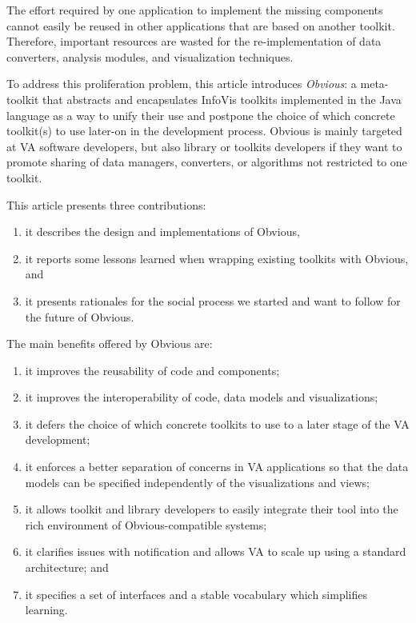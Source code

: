 The effort required by one application to implement the missing
components cannot easily be reused in other applications that are based on another
toolkit.  Therefore, important resources are wasted for the re-implementation of
data converters, analysis modules, and visualization techniques. 

To address this proliferation problem, this article introduces
\emph{Obvious}: a meta-toolkit that abstracts and encapsulates InfoVis
toolkits implemented in the Java language as a way to unify their use
and postpone the choice of which concrete toolkit(s) to use later-on
in the development process.  Obvious is mainly targeted at VA software
developers, but also  library or toolkits developers if they want to
promote sharing of data managers, converters, or algorithms not
restricted to one toolkit.

\noindent This article presents three contributions:
\begin{enumerate}[noitemsep,topsep=0pt]
\item it describes the design and implementations of Obvious,
\item it reports some lessons learned when wrapping existing toolkits
  with Obvious, and
\item it presents rationales for the social process we started and
  want to follow for the future of Obvious.
\end{enumerate}

\noindent The main benefits offered by Obvious are:
\begin{enumerate}[noitemsep,topsep=0pt]
\item it improves the reusability of code and components;
\item it improves the interoperability of code, data models and
  visualizations;
\item it defers the choice of which concrete toolkits to use to a
  later stage of the VA development;
\item it enforces a better separation of concerns in VA
  applications so that the data models can be specified independently
  of the visualizations and views;
\item it allows toolkit and library developers to easily integrate
  their tool into the rich environment of Obvious-compatible systems;
\item it clarifies issues with notification and allows VA to scale up using a standard architecture; and
\item it specifies a set of interfaces and a stable vocabulary which
  simplifies learning.
\end{enumerate}

